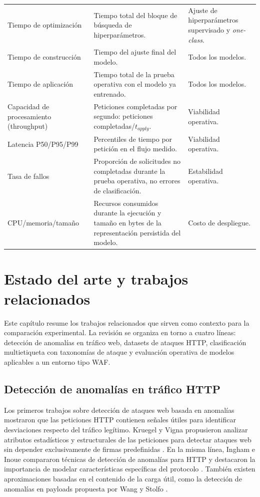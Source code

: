\documentclass[12pt,oneside]{report}
\begin{document}
\begin{longtable}{@{}L{0.24\textwidth}L{0.43\textwidth}L{0.25\textwidth}@{}}
Tiempo de optimización & Tiempo total del bloque de búsqueda de hiperparámetros. & Ajuste de hiperparámetros supervisado y \textit{one-class}. \\
Tiempo de construcción & Tiempo del ajuste final del modelo.  & Todos los modelos. \\
Tiempo de aplicación & Tiempo total de la prueba operativa con el modelo ya entrenado. & Todos los modelos. \\
Capacidad de procesamiento (throughput) & Peticiones completadas por segundo: peticiones completadas/$t_{apply}$. & Viabilidad operativa. \\
Latencia P50/P95/P99 & Percentiles de tiempo por petición en el flujo medido. & Viabilidad operativa. \\
Tasa de fallos & Proporción de solicitudes no completadas durante la prueba operativa, no errores de clasificación. & Estabilidad operativa. \\
CPU/memoria/tamaño & Recursos consumidos durante la ejecución y tamaño en bytes de la representación persistida del modelo. & Costo de despliegue. \\
\bottomrule
\end{longtable}




\chapter{Estado del arte y trabajos relacionados}

Este capítulo resume los trabajos relacionados que sirven como contexto para la comparación experimental. La revisión se organiza en torno a cuatro líneas: detección de anomalías en tráfico web, datasets de ataques HTTP, clasificación multietiqueta con taxonomías de ataque y evaluación operativa de modelos aplicables a un entorno tipo WAF.

\section{Detección de anomalías en tráfico HTTP}
Los primeros trabajos sobre detección de ataques web basada en anomalías mostraron que las peticiones HTTP contienen señales útiles para identificar desviaciones respecto del tráfico legítimo. Kruegel y Vigna propusieron analizar atributos estadísticos y estructurales de las peticiones para detectar ataques web sin depender exclusivamente de firmas predefinidas \cite{kruegel_vigna_2003}. En la misma línea, Ingham e Inoue compararon técnicas de detección de anomalías para HTTP y destacaron la importancia de modelar características específicas del protocolo \cite{ingham_inoue_2007}. También existen aproximaciones basadas en el contenido de la carga útil, como la detección de anomalías en payloads propuesta por Wang y Stolfo \cite{wang_stolfo_2004}.
\end{document}
